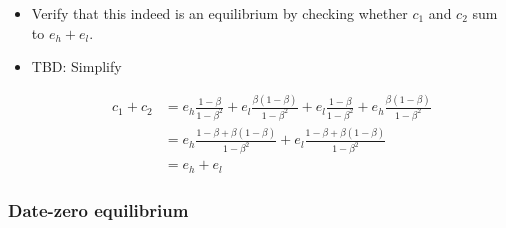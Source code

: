 \documentclass{scrartcl}
\begin{document}
\begin{itemize}
	\item Verify that this indeed is an equilibrium by checking whether $c_1$ and $c_2$ sum to $e_h+e_l$.
	\item TBD: Simplify
	
	\begin{align}
	c_1+c_2&=e_h\frac{1-\beta}{1-\beta^2}+e_l\frac{\beta(1-\beta)}{1-\beta^2}+e_l\frac{1-\beta}{1-\beta^2}+e_h\frac{\beta(1-\beta)}{1-\beta^2} \nonumber \\
	&= e_h \frac{1-\beta+\beta(1-\beta)}{1-\beta^2}+e_l \frac{1-\beta+\beta(1-\beta)}{1-\beta^2} \nonumber \\
	&=e_h+e_l
	\end{align}
		
\end{itemize}

\subsubsection*{Date-zero equilibrium}
\end{document}
